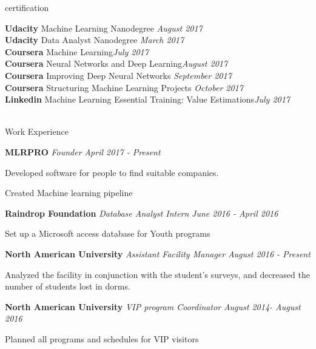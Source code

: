 \documentclass[14pt]{resume} %
\begin{document}


\begin{rSection}{certification}

{\bf Udacity} Machine Learning Nanodegree \hfill {\em August 2017}
\\ {\bf Udacity} Data Analyst Nanodegree \hfill {\em March 2017}
\\ {\bf Coursera} Machine Learning\hfill {\em July 2017}
\\ {\bf Coursera} Neural Networks and Deep Learning\hfill {\em August 2017}
\\ {\bf Coursera} Improving Deep Neural Networks \hfill {\em September 2017}
\\ {\bf Coursera} Structuring Machine Learning Projects \hfill {\em October 2017}
\\ {\bf Linkedin} Machine Learning Essential Training: Value Estimations\hfill {\em July 2017}
\\
\\


\end{rSection}


\begin{rSection}{Work Experience} \itemsep -2pt

{\bf MLRPRO} \textit{Founder} \hfill {\em April 2017 - Present} 
\item Developed software for people to find suitable companies. 
\item Created Machine learning pipeline

{\bf Raindrop Foundation} \textit{Database Analyst Intern} \hfill {\em June 2016 - April 2016} 
\item Set up a Microsoft access database for Youth programs

{\bf North American University} \textit{Assistant Facility Manager} \hfill {\em August 2016 - Present} 
\item Analyzed the facility in conjunction with the student’s surveys, and decreased the number of students lost in dorms.

{\bf North American University} \textit{VIP program Coordinator} \hfill {\em August 2014- August 2016} 
\item Planned all programs and schedules for VIP visitors 


\end{rSection}
\end{document}
